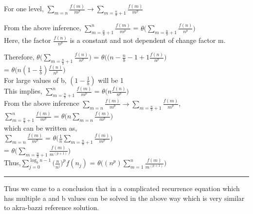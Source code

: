 \documentclass[11pt]{article}
\newenvironment{proof}{{\bf Proof:  }}{\hfill\rule{2mm}{2mm}}
\begin{document}
\begin{proof}
For one level, $\sum_{m=n} {\frac{f\left(m \right)}{m^{p}}}  \rightarrow  \sum_{m={\frac{n}{b}}+1} {\frac{f\left(m \right)}{m^{p}}}$ 

From the above inference, 
$\sum_{m={\frac{n}{b}}+1}^{n} {\frac{f\left(m \right)}{m^{p}}}$ = $ \theta \biggl(\sum_{m={\frac{n}{b}}+1} {\frac{f\left(n \right)}{n^{p}}}\biggr) $\\

Here, the factor ${\frac{f\left(n \right)}{n^{p}}} $ is a constant and not dependent of change factor m.

Therefore, $ \theta \biggl(\sum_{m={\frac{n}{b}}+1} {\frac{f\left(n \right)}{n^{p}}}\biggr) $ = $ \theta \biggl((n - \frac{n}{b} -1 + 1 {\frac{f\left(n \right)}{n^{p}}}\biggr) $ \\ 

= $ \theta \biggl(n(1 - \frac{1}{b})  {\frac{f\left(n \right)}{n^{p}}}\biggr) $ \\ 

For large values of b, $(1 - \frac{1}{b})$ will be 1\\
This implies, $\sum_{m={\frac{n}{b}}+1}^{n} {\frac{f\left(m \right)}{m^{p}}}$ = $ \theta \biggl(n  {\frac{f\left(n \right)}{n^{p}}}\biggr) $ \\
 From the above inference $\sum_{m=n} {\frac{f\left(m \right)}{m^{p}}}  \rightarrow  \sum_{m={\frac{n}{b}}+1} {\frac{f\left(m \right)}{m^{p}}}$,\\ 
 $\sum_{m={\frac{n}{b}}+1}^{n} {\frac{f\left(m \right)}{m^{p}}}$ = $ \theta \biggl(n  \sum_{m=n} {\frac{f\left(m \right)}{m^{p}}}\biggr) $ \\
  which can be written as,\\
  $\sum_{m=n} {\frac{f\left(m \right)}{m^{p}}}$ = $ \theta \biggl(\frac{1}{n}  \sum_{m={\frac{n}{b}}+1} {\frac{f\left(m \right)}{m^{p}}}\biggr) $ \\
  
 = $ \theta \biggl(\sum_{m={\frac{n}{b}}+1} {\frac{f\left(m \right)}{m^{(p+1)}}}\biggr) $ \\
 
 Thus,$\sum_{j=0}^{\log_b n - 1} {{\biggl(\frac{n}{n^{j}}\biggr)^{p}}}f\left(n_j\right)$ = $ \theta \biggl( (n^p)  \sum_{m=1}^{n} {\frac{f\left(m \right)}{m^{(p+1)}}}\biggr) $ \\

\end{proof}

 Thus we came to a conclusion that in a complicated recurrence equation which has multiple a and b values can be solved in the above way which is very similar to akra-bazzi reference solution.
 
\end{document}

